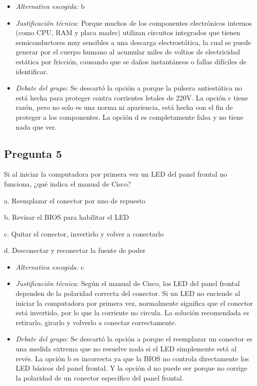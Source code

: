 \documentclass{article}
\begin{document}
\begin{itemize}
\item \emph{Alternativa escogida:} b
\item \emph{Justificación técnica:} Porque muchos de los componentes electrónicos internos (como CPU, RAM y placa madre) utilizan circuitos integrados que tienen semiconductores muy sensibles a una descarga electrostática, la cual se puede generar por el cuerpo humano al acumular miles de voltios de electricidad estática por fricción, causando que se daños instantáneos o fallas difíciles de identificar.
\item \emph{Debate del grupo:} Se descartó la opción a porque la pulsera antiestática no está hecha para proteger contra corrientes letales de 220V. La opción c tiene razón, pero no solo es una norma ni apariencia, está hecha con el fin de proteger a los componentes. La opción d es completamente falsa y no tiene nada que ver.
\end{itemize}
\subsection{Pregunta 5}
\label{sec:org686ae05}
Si al iniciar la computadora por primera vez un LED del panel frontal no funciona, ¿qué indica el manual de Cisco?

a. Reemplazar el conector por uno de repuesto

b. Revisar el BIOS para habilitar el LED

c. Quitar el conector, invertirlo y volver a conectarlo

d. Desconectar y reconectar la fuente de poder

\begin{itemize}
\item \emph{Alternativa escogida:} c
\item \emph{Justificación técnica:} Según el manual de Cisco, los LED del panel frontal dependen de la polaridad correcta del conector. Si un LED no enciende al iniciar la computadora por primera vez, normalmente significa que el conector está invertido, por lo que la corriente no circula. La solución recomendada es retirarlo, girarlo y volverlo a conectar correctamente.
\item \emph{Debate del grupo:} Se descartó la opción a porque el reemplazar un conector es una medida extrema que no resuelve nada si el LED simplemente está al revés. La opción b es incorrecta ya que la BIOS no controla directamente los LED básicos del panel frontal. Y la opción d no puede ser porque no corrige la polaridad de un conector específico del panel frontal.
\end{itemize}
\end{document}

